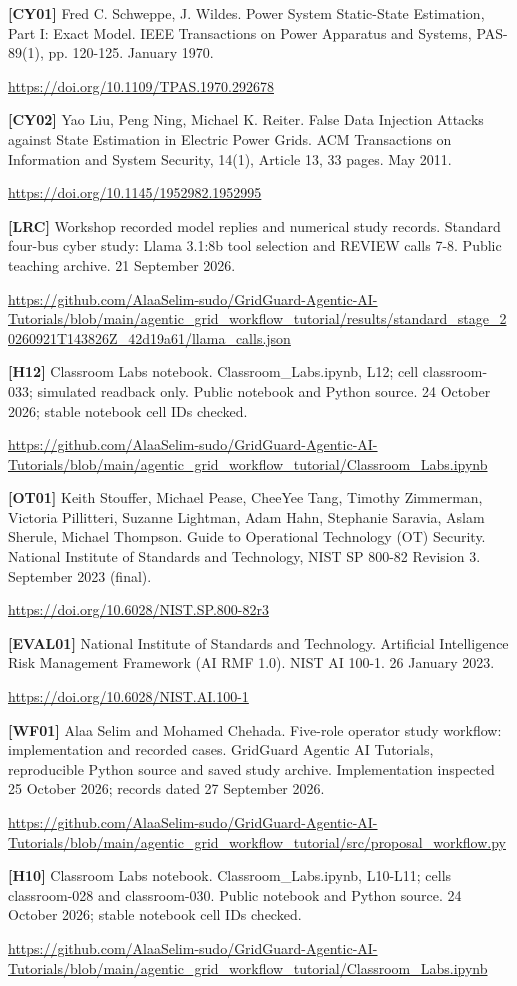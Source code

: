 \documentclass[12pt,letterpaper]{article}
\begin{document}
{\textbf{[CY01]} Fred C. Schweppe, J. Wildes. Power System Static-State Estimation, Part I: Exact Model. IEEE Transactions on Power Apparatus and Systems, PAS-89(1), pp. 120-125. January 1970.\par\url{https://doi.org/10.1109/TPAS.1970.292678}\par\medskip
\textbf{[CY02]} Yao Liu, Peng Ning, Michael K. Reiter. False Data Injection Attacks against State Estimation in Electric Power Grids. ACM Transactions on Information and System Security, 14(1), Article 13, 33 pages. May 2011.\par\url{https://doi.org/10.1145/1952982.1952995}\par\medskip
\textbf{[LRC]} Workshop recorded model replies and numerical study records. Standard four-bus cyber study: Llama 3.1:8b tool selection and REVIEW calls 7-8. Public teaching archive. 21 September 2026.\par\url{https://github.com/AlaaSelim-sudo/GridGuard-Agentic-AI-Tutorials/blob/main/agentic_grid_workflow_tutorial/results/standard_stage_20260921T143826Z_42d19a61/llama_calls.json}\par\medskip
\textbf{[H12]} Classroom Labs notebook. Classroom\_\allowbreak{}Labs.ipynb, L12; cell classroom-033; simulated readback only. Public notebook and Python source. 24 October 2026; stable notebook cell IDs checked.\par\url{https://github.com/AlaaSelim-sudo/GridGuard-Agentic-AI-Tutorials/blob/main/agentic_grid_workflow_tutorial/Classroom_Labs.ipynb}\par\medskip
\textbf{[OT01]} Keith Stouffer, Michael Pease, CheeYee Tang, Timothy Zimmerman, Victoria Pillitteri, Suzanne Lightman, Adam Hahn, Stephanie Saravia, Aslam Sherule, Michael Thompson. Guide to Operational Technology (OT) Security. National Institute of Standards and Technology, NIST SP 800-82 Revision 3. September 2023 (final).\par\url{https://doi.org/10.6028/NIST.SP.800-82r3}\par\medskip
\textbf{[EVAL01]} National Institute of Standards and Technology. Artificial Intelligence Risk Management Framework (AI RMF 1.0). NIST AI 100-1. 26 January 2023.\par\url{https://doi.org/10.6028/NIST.AI.100-1}\par\medskip
\textbf{[WF01]} Alaa Selim and Mohamed Chehada. Five-role operator study workflow: implementation and recorded cases. GridGuard Agentic AI Tutorials, reproducible Python source and saved study archive. Implementation inspected 25 October 2026; records dated 27 September 2026.\par\url{https://github.com/AlaaSelim-sudo/GridGuard-Agentic-AI-Tutorials/blob/main/agentic_grid_workflow_tutorial/src/proposal_workflow.py}\par\medskip
\textbf{[H10]} Classroom Labs notebook. Classroom\_\allowbreak{}Labs.ipynb, L10-L11; cells classroom-028 and classroom-030. Public notebook and Python source. 24 October 2026; stable notebook cell IDs checked.\par\url{https://github.com/AlaaSelim-sudo/GridGuard-Agentic-AI-Tutorials/blob/main/agentic_grid_workflow_tutorial/Classroom_Labs.ipynb}\par\medskip
}
\end{document}
